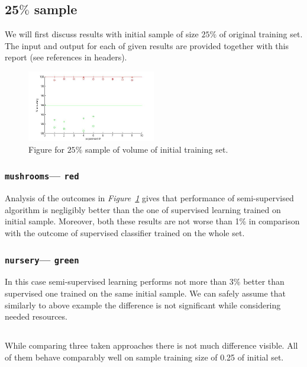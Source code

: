 \documentclass[12pt, a4paper, pdflatex]{report}
\begin{document}
\subsection{$\mathbf{25\%}$ sample~\cite{results25} \label{sec:results25}}
We will first discuss results with initial sample of size $25\%$ of original training set. The input and output for each of given results are provided together with this report (see references in headers).
\begin{figure}[htbp]
\centering
  \includegraphics[width=0.5\textwidth]{graphics/figures/Pfig1.jpg}
\begin{tiny}
\caption{\small Figure for $25\%$ sample of volume of initial training set.\label{img:25pc}}
\end{tiny}
\end{figure}

\subsubsection{\texttt{mushrooms}--- \texttt{red}}
Analysis of the outcomes in \emph{Figure~\ref{img:25pc}} gives that performance of semi-supervised algorithm is negligibly better than the one of supervised learning trained on initial sample. Moreover, both these results are not worse than 1\% in comparison with the outcome of supervised classifier trained on the whole set.

\subsubsection{\texttt{nursery}--- \texttt{green}}
In this case semi-supervised learning performs not more than 3\% better than supervised one trained on the same initial sample. We can safely assume that similarly to above example the difference is not significant while considering needed resources.

\subsection*{}
While comparing three taken approaches there is not much difference visible. All of them behave comparably well on sample training size of 0.25 of initial set.\\
\end{document}
